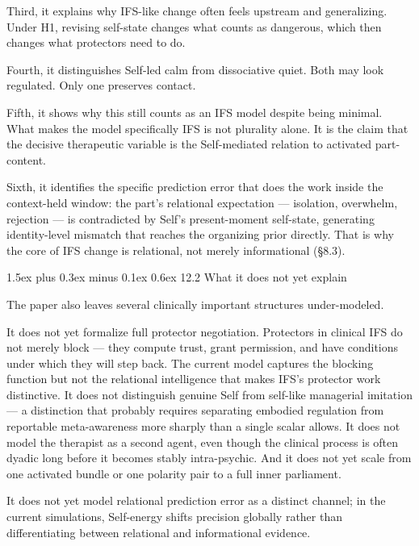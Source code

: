 \documentclass[12pt,a4paper]{article}
\makeatletter
\renewcommand\subsubsection{\@startsection{subsubsection}{3}{0pt}%
  {1.5ex plus 0.3ex minus 0.1ex}%
  {0.6ex}%
  {\normalsize\itshape}}
\makeatother
\begin{document}
Third, it explains why IFS-like change often feels upstream and
generalizing. Under H1, revising self-state changes what counts as
dangerous, which then changes what protectors need to do.

Fourth, it distinguishes Self-led calm from dissociative quiet. Both may
look regulated. Only one preserves contact.

Fifth, it shows why this still counts as an IFS model despite being
minimal. What makes the model specifically IFS is not plurality alone.
It is the claim that the decisive therapeutic variable is the
Self-mediated relation to activated part-content.

Sixth, it identifies the specific prediction error that does the work
inside the context-held window: the part's relational expectation ---
isolation, overwhelm, rejection --- is contradicted by Self's
present-moment self-state, generating identity-level mismatch that
reaches the organizing prior directly. That is why the core of IFS
change is relational, not merely informational (§8.3).

\subsubsection{12.2 What it does not yet
explain}\label{what-it-does-not-yet-explain}

The paper also leaves several clinically important structures
under-modeled.

It does not yet formalize full protector negotiation. Protectors in
clinical IFS do not merely block --- they compute trust, grant
permission, and have conditions under which they will step back. The
current model captures the blocking function but not the relational
intelligence that makes IFS's protector work distinctive. It does not
distinguish genuine Self from self-like managerial imitation --- a
distinction that probably requires separating embodied regulation from
reportable meta-awareness more sharply than a single scalar allows. It
does not model the therapist as a second agent, even though the clinical
process is often dyadic long before it becomes stably intra-psychic. And
it does not yet scale from one activated bundle or one polarity pair to
a full inner parliament.

It does not yet model relational prediction error as a distinct channel;
in the current simulations, Self-energy shifts precision globally rather
than differentiating between relational and informational evidence.
\end{document}
